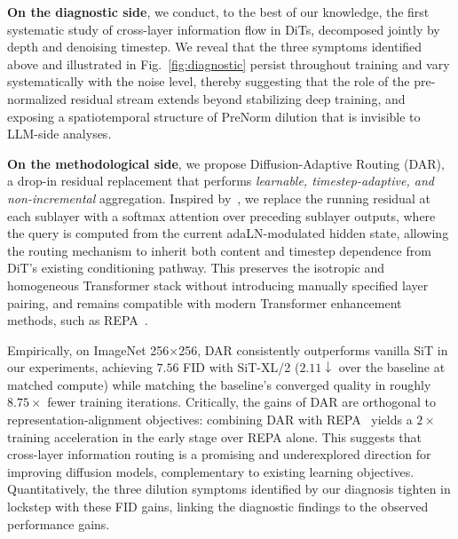 \documentclass{llmxive}
\begin{document}
\textbf{On the diagnostic side}, we conduct, to the best of our knowledge, the first systematic study of cross-layer information flow in DiTs, decomposed jointly by depth and denoising timestep. We reveal that the three symptoms identified above and illustrated in Fig.~\ref{fig:diagnostic} persist throughout training and vary systematically with the noise level, thereby suggesting that the role of the pre-normalized residual stream extends beyond stabilizing deep training, and exposing a spatiotemporal structure of PreNorm dilution that is invisible to LLM-side analyses.

\textbf{On the methodological side}, we propose Diffusion-Adaptive Routing (\textsc{DAR}), a drop-in residual replacement that performs \emph{learnable, timestep-adaptive, and non-incremental} aggregation. Inspired by~\citep{team2026attention}, we replace the running residual at each sublayer with a softmax attention over preceding sublayer outputs, where the query is computed from the current adaLN-modulated hidden state, allowing the routing mechanism to inherit both content and timestep dependence from DiT's existing conditioning pathway. This preserves the isotropic and homogeneous Transformer stack without introducing manually specified layer pairing, and remains compatible with modern Transformer enhancement methods, such as REPA~\citep{yu2025repa}.

Empirically, on ImageNet 256$\times$256, \textsc{DAR} consistently outperforms vanilla SiT in our experiments, achieving $7.56$ FID with SiT-XL/2 ($2.11\downarrow$ over the baseline at matched compute) while matching the baseline's converged quality in roughly $8.75 \times$ fewer training iterations. Critically, the gains of \textsc{DAR} are orthogonal to representation-alignment objectives: combining \textsc{DAR} with REPA~\citep{yu2025repa} yields a $2\times$ training acceleration in the early stage over REPA alone. This suggests that cross-layer information routing is a promising and underexplored direction for improving diffusion models, complementary to existing learning objectives. Quantitatively, the three dilution symptoms identified by our diagnosis tighten in lockstep with these FID gains, linking the diagnostic findings to the observed performance gains.
\end{document}
